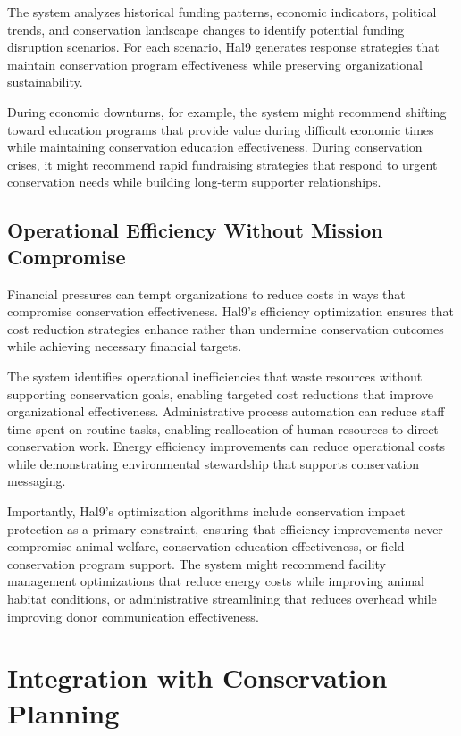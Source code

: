 \documentclass[
  Letterpaper,
]{scrbook}
\begin{document}
The system analyzes historical funding patterns, economic indicators,
political trends, and conservation landscape changes to identify
potential funding disruption scenarios. For each scenario, Hal9
generates response strategies that maintain conservation program
effectiveness while preserving organizational sustainability.

During economic downturns, for example, the system might recommend
shifting toward education programs that provide value during difficult
economic times while maintaining conservation education effectiveness.
During conservation crises, it might recommend rapid fundraising
strategies that respond to urgent conservation needs while building
long-term supporter relationships.

\subsection{Operational Efficiency Without Mission
Compromise}\label{operational-efficiency-without-mission-compromise}

Financial pressures can tempt organizations to reduce costs in ways that
compromise conservation effectiveness. Hal9's efficiency optimization
ensures that cost reduction strategies enhance rather than undermine
conservation outcomes while achieving necessary financial targets.

The system identifies operational inefficiencies that waste resources
without supporting conservation goals, enabling targeted cost reductions
that improve organizational effectiveness. Administrative process
automation can reduce staff time spent on routine tasks, enabling
reallocation of human resources to direct conservation work. Energy
efficiency improvements can reduce operational costs while demonstrating
environmental stewardship that supports conservation messaging.

Importantly, Hal9's optimization algorithms include conservation impact
protection as a primary constraint, ensuring that efficiency
improvements never compromise animal welfare, conservation education
effectiveness, or field conservation program support. The system might
recommend facility management optimizations that reduce energy costs
while improving animal habitat conditions, or administrative
streamlining that reduces overhead while improving donor communication
effectiveness.

\section{Integration with Conservation
Planning}\label{integration-with-conservation-planning}
\end{document}
